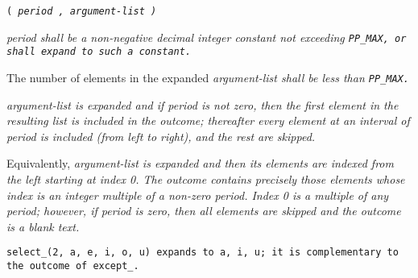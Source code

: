 
 \tt{(} \it{period} \tt{,} \it{argument-list} \tt{)}


\it{period} shall be a non-negative decimal integer  constant
not exceeding \tt{PP_MAX}, or shall expand to such a constant.

The number of elements in the expanded
\it{argument-list} shall be less than \tt{PP_MAX}.


\it{argument-list} is expanded and if \it{period} is not zero, then
the first element in the resulting list is included in the outcome;
thereafter every element at an interval of \it{period} is
included (from left to right), and the rest are skipped.

Equivalently, \it{argument-list} is expanded and then its
elements are indexed from the left starting at index 0.
The outcome contains precisely those elements whose
index is an integer multiple of a non-zero \it{period}.
Index 0 is a multiple of any \it{period}; however, if \it{period} is
zero, then all elements are skipped and the outcome is a blank text.

\example \tt{select_(2, a, e, i, o, u)} expands to \tt{a, i, u};
it is complementary to the outcome of \tt{except_}.
